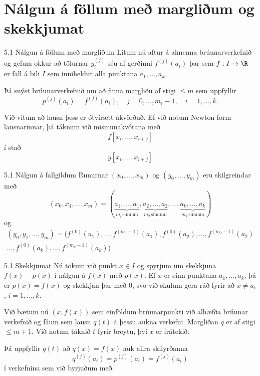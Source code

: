 \section*{Nálgun á föllum með margliðum og skekkjumat}

\begin{frame}{5.1  Nálgun á föllum með margliðum} 
Lítum nú aftur á almenna brúunarverkefnið og
gefum okkur að  tölurnar $y_i^{(j)}$ séu af gerðinni $f^{(j)}(a_i)$ 
þar sem $f : I \to \R$ er fall á bili $I$ sem inniheldur alla
punktana  $a_1, \ldots, a_k$.

\pause
\smallskip
Þá snýst brúunarverkefnið um að finna
margliðu  af stigi $\leq m$ sem uppfyllir
\begin{equation*}
  p^{(j)}(a_i) = f^{(j)}(a_i), \quad
  j = 0, \ldots, m_i-1, \quad i = 1, \ldots, k.
\end{equation*}

\pause
\smallskip
Við vitum að lausn þess er ótvírætt ákvörðuð.  Ef við notum Newton
form lausnarinnar, þá táknum við mismunakvótana með
$$
f[x_i,\ldots,x_{i+j}]
$$
í stað 
$$
y[x_i,\ldots,x_{i+j}]
$$
\end{frame}

\begin{frame}{5.1 Nálgun á fallgildum} 
Runurnar $(x_0,\ldots,x_m)$ og 
$(y_0,\ldots,y_m)$ eru skilgreindar með 
\begin{equation*}
  (x_0,x_1,\ldots,x_m) = 
  (\underbrace{a_1, \ldots, a_1}_{m_i \, \text{sinnum}}, 
  \underbrace{a_2, \ldots , a_2}_{m_2 \, \text{sinnum}}, 
  \ldots , 
  \underbrace{a_k, \ldots , a_k}_{m_k \, \text{sinnum}}) 
\end{equation*}
og
\begin{multline*}
  (y_0,y_1,\ldots,y_m) = 
  (f^{(0)}(a_1), \ldots, f^{(m_1-1)}(a_1),
f^{(0)}(a_2), \ldots, f^{(m_2-1)}(a_2) \\ \ldots,
  f^{(0)}(a_k), \ldots, f^{(m_k-1)}(a_k))
  \label{bru.margfald.5}
\end{multline*}
\end{frame}

\begin{frame}{5.1 Skekkjumat} 
Nú tökum við punkt $x \in I$ og spyrjum um skekkjuna 
$f(x) - p(x)$ í nálgun á $f(x)$ með $p(x)$. Ef $x$ er einn punktana 
$a_1, \ldots, a_k$, þá er $p(x) = f(x)$ og skekkjan þar með 0, svo 
við skulum gera ráð fyrir að $x \not= a_i$, $i = 1, \ldots, k$.

\pause
\smallskip
Við bætum nú $(x,f(x))$ sem einföldum brúunarpunkti við
alhæfða brúunar verkefnið  og fáum sem lausn $q(t)$ á þessu aukna verkefni. 
Margliðan $q$ er af stigi $\leq m+1$. Við notum táknið $t$ fyrir 
breytu, því $x$ er frátekið. 

\pause
\smallskip
Þá uppfyllir $q(t)$ að $q(x) = f(x)$ 
auk allra skilyrðanna 
$$
q^{(j)}(a_i) = p^{(j)}(a_i) = f^{(j)}(a_i)
$$ 
í verkefninu sem við byrjuðum með.
\end{frame}

